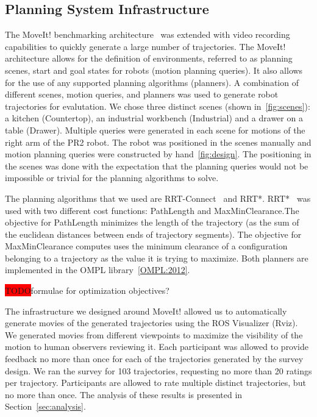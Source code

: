 \documentclass[letterpaper, 10 pt, conference]{ieeeconf}  %
\newcommand{\todo}{\colorbox{red}{TODO}}
\begin{document}
\subsection{Planning System Infrastructure}

The MoveIt! benchmarking architecture~\cite{cohen2012generic} was extended with video recording capabilities to quickly generate a large number of trajectories. The MoveIt! architecture allows for the definition of environments, referred to as planning scenes, start and goal states for robots (motion planning queries). It also allows for the use of any supported planning algorithms (planners). A combination of different scenes, motion queries, and planners was used to generate robot trajectories for evalutation. We chose three distinct scenes (shown in~\ref{fig:scenes}): a kitchen ({\sc Countertop}), an industrial workbench ({\sc Industrial}) and a drawer on a table ({\sc Drawer}). Multiple queries were generated in each scene for motions of the right arm of the PR2 robot. The robot was positioned in the scenes manually and motion planning queries were constructed by hand~\ref{fig:design}. The positioning in the scenes was done with the expectation that the planning queries would not be impossible or trivial for the planning algorithms to solve. 


The planning algorithms that we used are RRT-Connect~\cite{kuffner2000rrt} and RRT*.  RRT*~\cite{frazzoli-RRTstar} was used with two different cost functions: {\sc PathLength} and {\sc MaxMinClearance}.The objective for {\sc PathLength} minimizes the length of the trajectory (as the sum of the euclidean distances between ends of trajectory segments). The objective for {\sc MaxMinClearance} computes uses the minimum clearance of a configuration belonging to a trajectory as the value it is trying to maximize. Both planners are implemented in the OMPL library~\ref{OMPL:2012}. 

\todo formulae for optimization objectives?

The infrastructure we designed around MoveIt! allowed us to automatically generate movies of the generated trajectories using the ROS Visualizer (Rviz). We generated movies from different viewpoints to maximize the visibility of the motion to human observers reviewing it. Each participant was allowed to provide feedback no more than once for each of the trajectories generated by the survey design. We ran the survey for 103 trajectories, requesting no more than 20 ratings per trajectory. Participants are allowed to rate multiple distinct trajectories, but no more than once. The analysis of these results is presented in Section~\ref{sec:analysis}.
\end{document}
